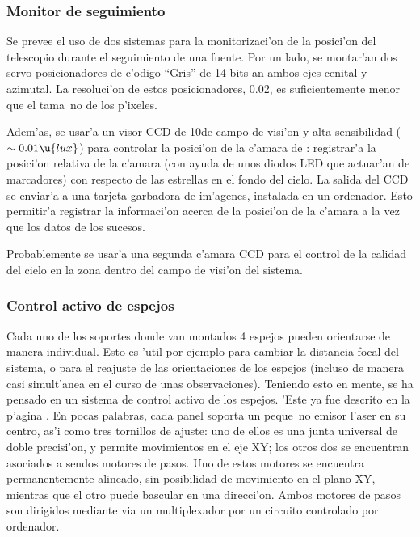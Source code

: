 \subsubsection{Monitor de seguimiento}
%
Se prevee el uso de dos sistemas para la monitorizaci'on de la
posici'on del telescopio durante el seguimiento de una fuente. Por un
lado, se montar'an dos servo-posicionadores de c'odigo ``Gris'' de 14
bits an ambos ejes cenital y azimutal. La resoluci'on de estos
posicionadores, 0.02\deg, es suficientemente menor que el tama~no de
los p'ixeles.

Adem'as, se usar'a un visor CCD de 10\deg de campo de visi'on y alta
sensibilidad ($\sim 0.01\u{lux}$) para controlar la posici'on de la
c'amara de \MAGIC: registrar'a la posici'on relativa de la c'amara
(con ayuda de unos diodos LED que actuar'an de marcadores) con
respecto de las estrellas en el fondo del cielo. La salida del CCD se
enviar'a a una tarjeta garbadora de im'agenes, instalada en un
ordenador. Esto permitir'a registrar la informaci'on acerca de la
posici'on de la c'amara a la vez que los datos de los sucesos.

Probablemente se usar'a una segunda c'amara CCD para el control de la
calidad del cielo en la zona dentro del campo de visi'on del sistema.

\subsubsection{Control activo de espejos}
%
Cada uno de los soportes donde van montados 4 espejos pueden
orientarse de manera individual. Esto es 'util por ejemplo para
cambiar la distancia focal del sistema, o para el reajuste de las
orientaciones de los espejos (incluso de manera casi simult'anea en el
curso de unas observaciones). Teniendo esto en mente, se ha pensado en
un sistema de control activo de los espejos. 'Este ya fue descrito en
la p'agina
\pageref{label:amcs}. En pocas palabras, cada panel soporta un
peque~no emisor l'aser en su centro, as'i como tres tornillos de
ajuste: uno de ellos es una junta universal de doble precisi'on, y
permite movimientos en el eje XY; los otros dos se encuentran
asociados a sendos motores de pasos. Uno de estos motores se encuentra
permanentemente alineado, sin posibilidad de movimiento en el plano
XY, mientras que el otro puede bascular en una direcci'on. Ambos
motores de pasos son dirigidos mediante via un multiplexador por un
circuito controlado por ordenador.

